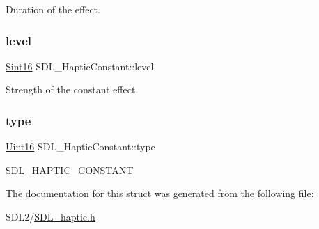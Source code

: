 Duration of the effect. \mbox{\label{struct_s_d_l___haptic_constant_a5b095eea77464623ed57af15f29f4ca6}} 
\subsubsection{\texorpdfstring{level}{level}}
{\footnotesize\ttfamily \hyperlink{_s_d_l__stdinc_8h_a9d0257032c0e146ab6121bf0122712f5}{Sint16} S\+D\+L\+\_\+\+Haptic\+Constant\+::level}

Strength of the constant effect. \mbox{\label{struct_s_d_l___haptic_constant_a5cb31202803a8bc1be95fcede5ac8afb}} 
\subsubsection{\texorpdfstring{type}{type}}
{\footnotesize\ttfamily \hyperlink{_s_d_l__stdinc_8h_a31fcc0a076c9068668173ee26d33e42b}{Uint16} S\+D\+L\+\_\+\+Haptic\+Constant\+::type}

\hyperlink{_s_d_l__haptic_8h_a955fb9f680dcf9cc72a3d5263e85b80a}{S\+D\+L\+\_\+\+H\+A\+P\+T\+I\+C\+\_\+\+C\+O\+N\+S\+T\+A\+NT} 

The documentation for this struct was generated from the following file\+:\begin{DoxyCompactItemize}
\item 
S\+D\+L2/\hyperlink{_s_d_l__haptic_8h}{S\+D\+L\+\_\+haptic.\+h}\end{DoxyCompactItemize}
